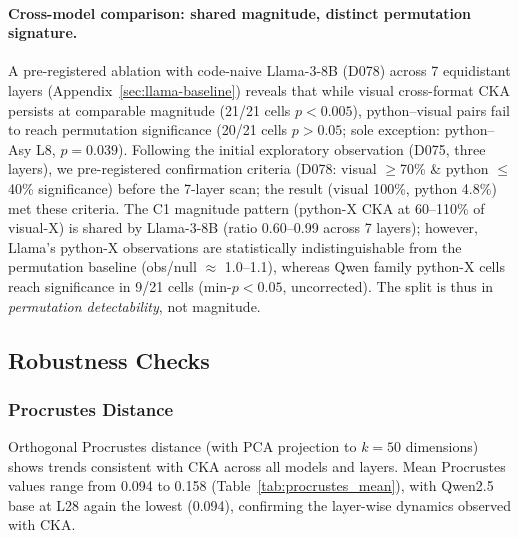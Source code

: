 \paragraph{Cross-model comparison: shared magnitude, distinct permutation signature.}
A pre-registered ablation with code-naive Llama-3-8B (D078) across 7 equidistant layers (Appendix~\ref{sec:llama-baseline}) reveals that while visual cross-format CKA persists at comparable magnitude (21/21 cells $p < 0.005$), python--visual pairs fail to reach permutation significance (20/21 cells $p > 0.05$; sole exception: python--Asy L8, $p = 0.039$).
Following the initial exploratory observation (D075, three layers), we pre-registered confirmation criteria (D078: visual $\geq$70\% \& python $\leq$40\% significance) before the 7-layer scan; the result (visual 100\%, python 4.8\%) met these criteria.
The C1 magnitude pattern (python-X CKA at 60--110\% of visual-X) is shared by Llama-3-8B (ratio 0.60--0.99 across 7 layers); however, Llama's python-X observations are statistically indistinguishable from the permutation baseline (obs/null $\approx$ 1.0--1.1), whereas Qwen family python-X cells reach significance in 9/21 cells (min-$p<0.05$, uncorrected).
The split is thus in \emph{permutation detectability}, not magnitude.

\subsection{Robustness Checks}
\label{sec:robustness}

\subsubsection{Procrustes Distance}
\label{sec:robustness-procrustes}

Orthogonal Procrustes distance (with PCA projection to $k=50$ dimensions) shows trends consistent with CKA across all models and layers.
Mean Procrustes values range from 0.094 to 0.158 (Table~\ref{tab:procrustes_mean}), with Qwen2.5 base at L28 again the lowest (0.094), confirming the layer-wise dynamics observed with CKA.

\begin{table}[!ht]
\centering
\small
\caption{Mean Procrustes distance (PCA $k$=50) per model at selected layers.}
\label{tab:procrustes_mean}
\end{table}

